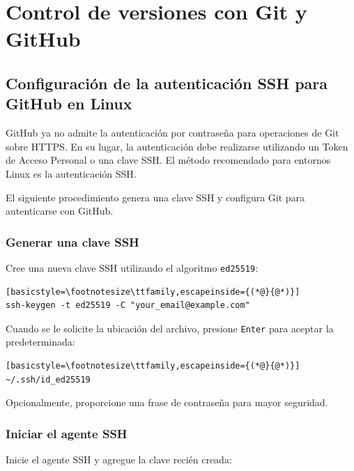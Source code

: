 \chapter{Control de versiones con Git y GitHub}
\label{ch:git}

\section{Configuración de la autenticación SSH para GitHub en Linux}
GitHub ya no admite la autenticación por contraseña para operaciones de Git sobre HTTPS.
En su lugar, la autenticación debe realizarse utilizando un Token de Acceso Personal o
una clave SSH. El método recomendado para entornos Linux es la autenticación SSH.

El siguiente procedimiento genera una clave SSH y configura Git para autenticarse
con GitHub.

\subsection{Generar una clave SSH}

Cree una nueva clave SSH utilizando el algoritmo \texttt{ed25519}:

\begin{lstlisting}[basicstyle=\footnotesize\ttfamily,escapeinside={(*@}{@*)}]
ssh-keygen -t ed25519 -C "your_email@example.com"
\end{lstlisting}

Cuando se le solicite la ubicación del archivo, presione \texttt{Enter} para aceptar la predeterminada:

\begin{lstlisting}[basicstyle=\footnotesize\ttfamily,escapeinside={(*@}{@*)}]
~/.ssh/id_ed25519
\end{lstlisting}

Opcionalmente, proporcione una frase de contraseña para mayor seguridad.

\subsection{Iniciar el agente SSH}

Inicie el agente SSH y agregue la clave recién creada:

